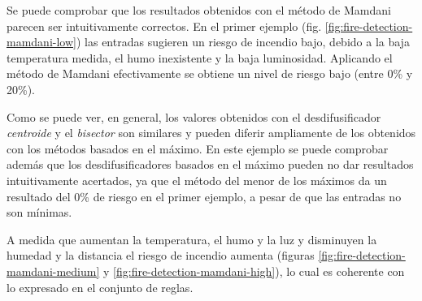 Se puede comprobar que los resultados obtenidos con el método de Mamdani parecen ser intuitivamente correctos. En el primer ejemplo (fig. \ref{fig:fire-detection-mamdani-low}) las entradas sugieren un riesgo de incendio bajo, debido a la baja temperatura medida, el humo inexistente y la baja luminosidad. Aplicando el método de Mamdani efectivamente se obtiene un nivel de riesgo bajo (entre 0\% y 20\%). 

Como se puede ver, en general, los valores obtenidos con el desdifusificador \emph{centroide} y el \emph{bisector} son similares y pueden diferir ampliamente de los obtenidos con los métodos basados en el máximo. En este ejemplo se puede comprobar además que los desdifusificadores basados en el máximo pueden no dar resultados intuitivamente acertados, ya que el método del menor de los máximos da un resultado del 0\% de riesgo en el primer ejemplo, a pesar de que las entradas no son mínimas.

A medida que aumentan la temperatura, el humo y la luz y disminuyen la humedad y la distancia el riesgo de incendio aumenta (figuras \ref{fig:fire-detection-mamdani-medium} y \ref{fig:fire-detection-mamdani-high}), lo cual es coherente con lo expresado en el conjunto de reglas.

